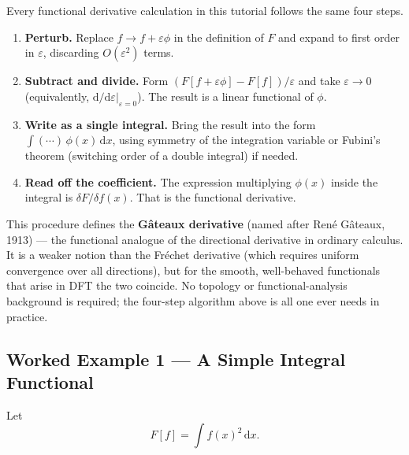 \documentclass[12pt,letterpaper]{article}
\newcommand{\dd}{\mathrm{d}}
\theoremstyle{definition}
\begin{document}
\begin{keyresult}[title={Algorithm: How to Compute a Functional Derivative}]
Every functional derivative calculation in this tutorial follows the same
four steps.
\begin{enumerate}[label=\textbf{Step \arabic*.}, leftmargin=*, itemsep=4pt]
  \item \textbf{Perturb.}
    Replace $f \to f + \varepsilon\phi$ in the definition of $F$ and expand
    to first order in $\varepsilon$, discarding $O(\varepsilon^2)$ terms.
  \item \textbf{Subtract and divide.}
    Form $(F[f+\varepsilon\phi] - F[f])/\varepsilon$ and take $\varepsilon\to 0$
    (equivalently, $\dd/\dd\varepsilon|_{\varepsilon=0}$).
    The result is a linear functional of $\phi$.
  \item \textbf{Write as a single integral.}
    Bring the result into the form $\int (\cdots)\,\phi(x)\,\dd x$,
    using symmetry of the integration variable or Fubini's theorem
    (switching order of a double integral) if needed.
  \item \textbf{Read off the coefficient.}
    The expression multiplying $\phi(x)$ inside the integral is
    $\delta F/\delta f(x)$.
    That is the functional derivative.
\end{enumerate}
\noindent This procedure defines the \textbf{Gâteaux derivative} (named after
René Gâteaux, 1913) --- the functional analogue of the directional derivative
in ordinary calculus.
It is a weaker notion than the Fréchet derivative (which requires uniform
convergence over all directions), but for the smooth, well-behaved functionals
that arise in DFT the two coincide.
No topology or functional-analysis background is required; the four-step
algorithm above is all one ever needs in practice.
\end{keyresult}

\subsection{Worked Example 1 --- A Simple Integral Functional}

Let
\begin{equation}
  F[f] = \int f(x)^2\,\dd x.
  \label{eq:ex1_F}
\end{equation}
\end{document}
